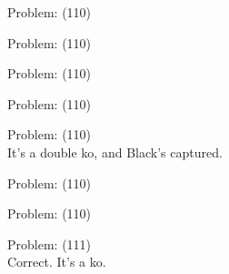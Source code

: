 \documentclass[11pt]{article}
\begin{document}
\begin{minipage}[t]{0.5\textwidth}
  {\centering
  
  Problem: (110)\\
  
  }
\end{minipage}
\begin{minipage}[t]{0.5\textwidth}
  {\centering
  
  Problem: (110)\\
  
  }
\end{minipage}
\begin{minipage}[t]{0.5\textwidth}
  {\centering
  
  Problem: (110)\\
  
  }
\end{minipage}
\begin{minipage}[t]{0.5\textwidth}
  {\centering
  
  Problem: (110)\\
  
  }
\end{minipage}
\begin{minipage}[t]{0.5\textwidth}
  {\centering
  
  Problem: (110)\\
  It's a double ko, and Black's captured.\\
  }
\end{minipage}
\begin{minipage}[t]{0.5\textwidth}
  {\centering
  
  Problem: (110)\\
  
  }
\end{minipage}
\begin{minipage}[t]{0.5\textwidth}
  {\centering
  
  Problem: (110)\\
  
  }
\end{minipage}
\begin{minipage}[t]{0.5\textwidth}
  {\centering
  
  Problem: (111)\\
  Correct. It's a ko.\\
  }
\end{minipage}
\end{document}
